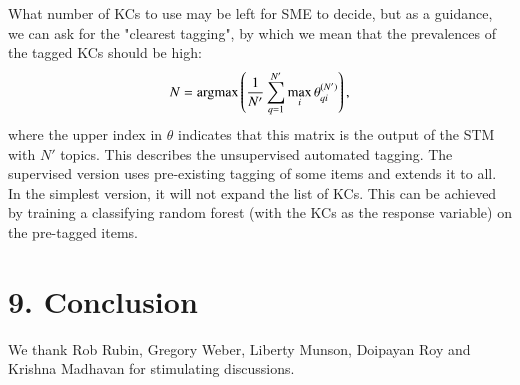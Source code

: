 \documentclass{sigchi}
\newcommand{\1}{\mathbf{1}}
\newcommand{\be}{\begin{equation}}
\newcommand{\ee}{\end{equation}}
\newcommand{\argmax}{\operatornamewithlimits{argmax}}
\begin{document}
What number of KCs to use may be left for SME to decide, but as a guidance, we can ask for the "clearest tagging", by which we mean that the prevalences of the tagged KCs should be high: 
\be N=\argmax\left(\frac{1}{N'}\sum_{q=1}^{N'}\max_{i}\theta^{(N')}_{qi}\right),\ee
where the upper index in $\theta$ indicates that this matrix is the output of the STM with $N'$ topics. This describes the unsupervised automated tagging. The supervised version uses pre-existing tagging of some items and extends it to all. In the simplest version, it will not expand the list of KCs. This can be achieved by training a classifying random forest (with the KCs as the response variable) on the pre-tagged items. 


\section{9. Conclusion}
We thank Rob Rubin, Gregory Weber, Liberty Munson, Doipayan Roy and Krishna Madhavan for stimulating discussions.
\label{sec:conc}



\balance{}



\end{document}
